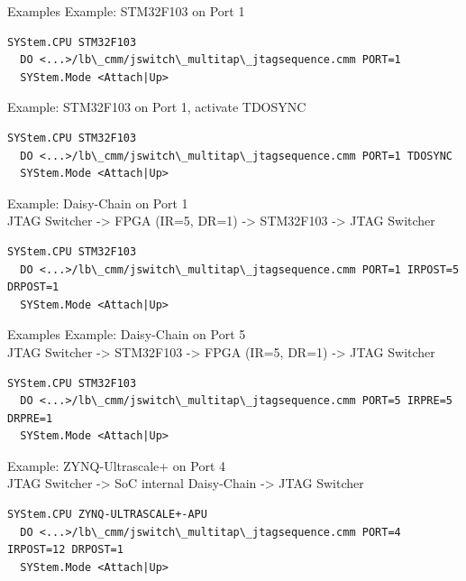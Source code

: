 \documentclass[aspectratio=169,12pt]{beamer}
\begin{document}
\begin{frame}[fragile]{Examples}
Example: STM32F103 on Port 1\\
\begin{Verbatim}[fontsize=\tiny,commandchars=\\\{\}]
  SYStem.CPU STM32F103
  DO <...>/lb\_cmm/jswitch\_multitap\_jtagsequence.cmm PORT=1
  SYStem.Mode <Attach|Up>
\end{Verbatim}

Example: STM32F103 on Port 1, activate TDOSYNC\\
\begin{Verbatim}[fontsize=\tiny,commandchars=\\\{\}]
  SYStem.CPU STM32F103
  DO <...>/lb\_cmm/jswitch\_multitap\_jtagsequence.cmm PORT=1 TDOSYNC
  SYStem.Mode <Attach|Up>
\end{Verbatim}

Example: Daisy-Chain on Port 1\\JTAG Switcher -> FPGA (IR=5, DR=1) -> STM32F103 -> JTAG Switcher\\
\begin{Verbatim}[fontsize=\tiny,commandchars=\\\{\}]
  SYStem.CPU STM32F103
  DO <...>/lb\_cmm/jswitch\_multitap\_jtagsequence.cmm PORT=1 IRPOST=5 DRPOST=1
  SYStem.Mode <Attach|Up>
\end{Verbatim}
\end{frame}

\begin{frame}[fragile]{Examples}
Example: Daisy-Chain on Port 5\\JTAG Switcher -> STM32F103 -> FPGA (IR=5, DR=1) -> JTAG Switcher\\
\begin{Verbatim}[fontsize=\tiny,commandchars=\\\{\}]
  SYStem.CPU STM32F103
  DO <...>/lb\_cmm/jswitch\_multitap\_jtagsequence.cmm PORT=5 IRPRE=5 DRPRE=1
  SYStem.Mode <Attach|Up>
\end{Verbatim}
Example: ZYNQ-Ultrascale+ on Port 4\\JTAG Switcher -> SoC internal Daisy-Chain -> JTAG Switcher\\
\begin{Verbatim}[fontsize=\tiny,commandchars=\\\{\}]
  SYStem.CPU ZYNQ-ULTRASCALE+-APU
  DO <...>/lb\_cmm/jswitch\_multitap\_jtagsequence.cmm PORT=4 IRPOST=12 DRPOST=1
  SYStem.Mode <Attach|Up>
\end{Verbatim}
\end{frame}
\end{document}
